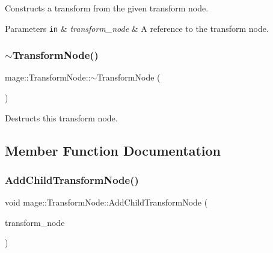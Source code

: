 Constructs a transform from the given transform node.


\begin{DoxyParams}[1]{Parameters}
\mbox{\tt in}  & {\em transform\+\_\+node} & A reference to the transform node. \\
\hline
\end{DoxyParams}
\hypertarget{classmage_1_1_transform_node_a0c5e84d99c27cda31dae8106611d682f}{}\label{classmage_1_1_transform_node_a0c5e84d99c27cda31dae8106611d682f} 
\subsubsection{\texorpdfstring{$\sim$\+Transform\+Node()}{~TransformNode()}}
{\footnotesize\ttfamily mage\+::\+Transform\+Node\+::$\sim$\+Transform\+Node (\begin{DoxyParamCaption}{ }\end{DoxyParamCaption})\hspace{0.3cm}{\ttfamily [virtual]}}

Destructs this transform node. 

\subsection{Member Function Documentation}
\hypertarget{classmage_1_1_transform_node_aae1b47587cbe7315eff368333442ddd6}{}\label{classmage_1_1_transform_node_aae1b47587cbe7315eff368333442ddd6} 
\subsubsection{\texorpdfstring{Add\+Child\+Transform\+Node()}{AddChildTransformNode()}}
{\footnotesize\ttfamily void mage\+::\+Transform\+Node\+::\+Add\+Child\+Transform\+Node (\begin{DoxyParamCaption}\item[{\hyperlink{namespacemage_a1e01ae66713838a7a67d30e44c67703e}{Shared\+Ptr}$<$ \hyperlink{classmage_1_1_transform_node}{Transform\+Node} $>$}]{transform\+\_\+node }\end{DoxyParamCaption})}


